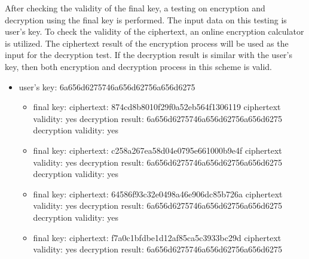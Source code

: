 After checking the validity of the final key, a testing on encryption and decryption using the final key is performed. The input data on this testing is user’s key. To check the validity of the ciphertext, an online encryption calculator \cite{aes_calculator} is utilized. The ciphertext result of the encryption process will be used as the input for the decryption test. If the decryption result is similar with the user’s key, then both encryption and decryption process in this scheme is valid.

\begin{itemize}
  \item user's key: 6a656d6275746a656d62756a656d6275
  \begin{itemize}
    \item final key: \newline
    ciphertext: 874cd8b8010f29f0a52eb564f1306119\newline
    ciphertext validity: yes\newline
    decryption result: 6a656d6275746a656d62756a656d6275\newline
    decryption validity: yes
    \item final key: \newline
    ciphertext: c258a267ea58d04e0795e661000b9e4f\newline
    ciphertext validity: yes\newline
    decryption result: 6a656d6275746a656d62756a656d6275\newline
    decryption validity: yes
    \item final key: \newline
    ciphertext: 64586f93c32e0498a46e906dc85b726a\newline
    ciphertext validity: yes\newline
    decryption result: 6a656d6275746a656d62756a656d6275\newline
    decryption validity: yes
    \item final key: \newline
    ciphertext: f7a0c1bfdbe1d12af85ca5c3933bc29d\newline
    ciphertext validity: yes\newline
    decryption result: 6a656d6275746a656d62756a656d6275\newline

\end{itemize}
\end{itemize}
